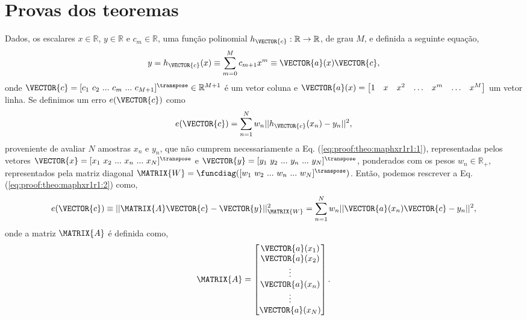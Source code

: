 \section{Provas dos teoremas}
 
\begin{myproofT}\label{proof:theo:maphxr1r1}
Dados,
os escalares $x \in \mathbb{R}$, $y \in \mathbb{R}$ e $c_m \in \mathbb{R}$,
uma função polinomial $h_{\VECTOR{c}}:\mathbb{R} \rightarrow \mathbb{R}$, de grau $M$, e 
definida a seguinte equação,
\begin{equation}\label{eq:proof:theo:maphxr1r1:1}
y=h_{\VECTOR{c}}(x)\equiv \sum_{m=0}^{M}c_{m+1} x^m\equiv \VECTOR{a}(x)\VECTOR{c},
\end{equation}
onde $\VECTOR{c}=[c_1~ c_2~ ...~ c_m~ ...~ c_{M+1}]^{\transpose} \in \mathbb{R}^{M+1}$ é um vetor coluna e
$\VECTOR{a}(x)=\begin{bmatrix} 
1& x& x^2& \hdots & x^m& \hdots& x^M
\end{bmatrix}$ um vetor linha.
Se definimos um erro $e(\VECTOR{c})$ como
\begin{equation}\label{eq:proof:theo:maphxr1r1:2}
e(\VECTOR{c}) =  \sum_{n=1}^{N} w_n||h_{\VECTOR{c}}(x_n)-y_n||^2,
\end{equation}
proveniente de avaliar $N$ amostras $x_n$ e $y_n$, 
que não cumprem necessariamente a Eq. (\ref{eq:proof:theo:maphxr1r1:1}), 
representadas pelos vetores $\VECTOR{x}=[x_1~ x_2~ ...~ x_n~ ...~ x_N]^{\transpose}$ e $\VECTOR{y}=[y_1~ y_2~ ...~ y_n~ ...~ y_N]^{\transpose}$,
ponderados com os pesos $w_n \in \mathbb{R}_+$, representados pela matriz diagonal $\MATRIX{W}=\funcdiag([w_1~ w_2~ ...~ w_n~ ...~ w_N]^{\transpose})$.
Então, podemos rescrever a Eq. (\ref{eq:proof:theo:maphxr1r1:2}) como,
\begin{equation}\label{eq:proof:theo:maphxr1r1:3}
e(\VECTOR{c}) \equiv ||\MATRIX{A}\VECTOR{c}-\VECTOR{y}||_{\MATRIX{W}}^2 =  \sum_{n=1}^{N} w_n||\VECTOR{a}(x_n)\VECTOR{c}-y_n||^2,
\end{equation}
onde a matriz $\MATRIX{A}$ é definida como,
\begin{equation}\label{eq:proof:maphxr1r1:4}
\MATRIX{A}=\begin{bmatrix}
\VECTOR{a}(x_1)\\
\VECTOR{a}(x_2)\\
\vdots\\
\VECTOR{a}(x_n)\\
\vdots\\
\VECTOR{a}(x_N)\\
\end{bmatrix}.
\end{equation}



\end{myproofT}
